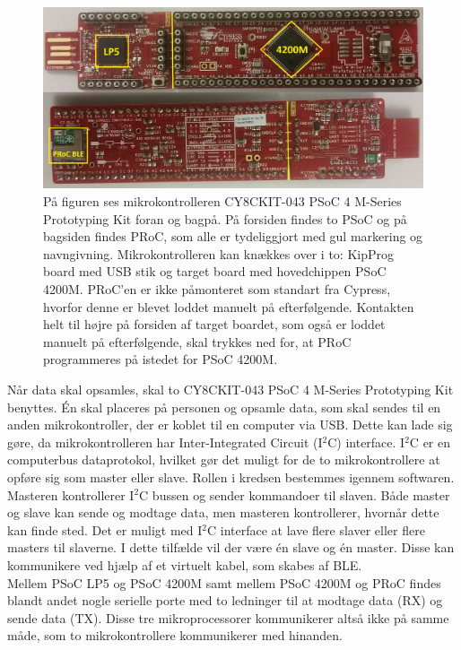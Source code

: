 \begin{figure}[H]
	\centering
	\includegraphics[scale=0.15]{figures/bProblemloesning/PSoC3.jpg}
	\caption{På figuren ses mikrokontrolleren CY8CKIT-043 PSoC 4 M-Series Prototyping Kit foran og bagpå. På forsiden findes to PSoC og på bagsiden findes PRoC, som alle er tydeliggjort med gul markering og navngivning. Mikrokontrolleren kan knækkes over i to: KipProg board med USB stik og target board med hovedchippen PSoC 4200M. PRoC'en er ikke påmonteret som standart fra Cypress, hvorfor denne er blevet loddet manuelt på efterfølgende. Kontakten helt til højre på forsiden af target boardet, som også er loddet manuelt på efterfølgende, skal trykkes ned for, at PRoC programmeres på istedet for PSoC 4200M. \citep{CYPRESS2016PSoC,Semiconductor2016}}
	\label{fig:PSoC}
\end{figure}
Når data skal opsamles, skal to CY8CKIT-043 PSoC 4 M-Series Prototyping Kit benyttes. Én skal placeres på personen og opsamle data, som skal sendes til en anden mikrokontroller, der er koblet til en computer via USB. Dette kan lade sig gøre, da mikrokontrolleren har Inter-Integrated Circuit (I$^{2}$C) interface. I$^{2}$C er en computerbus dataprotokol, hvilket gør det muligt for de to mikrokontrollere at opføre sig som master eller slave. Rollen i kredsen bestemmes igennem softwaren. Masteren kontrollerer I$^{2}$C bussen og sender kommandoer til slaven. Både master og slave kan sende og modtage data, men masteren kontrollerer, hvornår dette kan finde sted. Det er muligt med I$^{2}$C interface at lave flere slaver eller flere masters til slaverne. I dette tilfælde vil der være én slave og én master. Disse kan kommunikere ved hjælp af et virtuelt kabel, som skabes af BLE. \citep{Semiconductor2016,Sparkfun2016}\\
Mellem PSoC LP5 og PSoC 4200M samt mellem PSoC 4200M og PRoC findes blandt andet nogle serielle porte med to ledninger til at modtage data (RX) og sende data (TX). Disse tre mikroprocessorer kommunikerer altså ikke på samme måde, som to mikrokontrollere kommunikerer med hinanden. \citep{Semiconductor2016} \\
